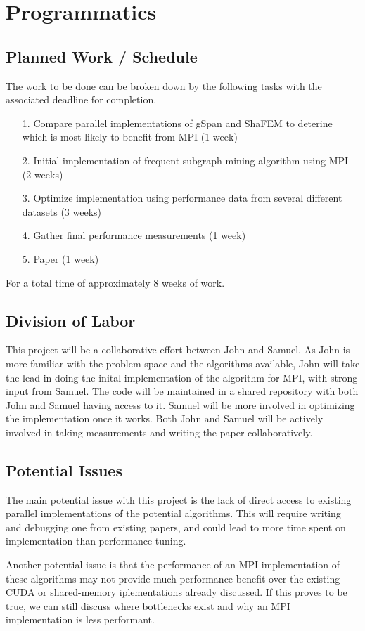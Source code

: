 \section{Programmatics}
\label{sec:programmatics}

\subsection{Planned Work / Schedule}
\label{sec:programmatics:work}

The work to be done can be broken down by the following tasks with the
associated deadline for completion.

\begin{itemize}
	\item[1.]{Compare parallel implementations of gSpan and ShaFEM to
		  deterine which is most likely to benefit from MPI (1 week)}
	\item[2.]{Initial implementation of frequent subgraph mining
		  algorithm using MPI (2 weeks)}
	\item[3.]{Optimize implementation using performance data from several
		  different datasets (3 weeks)}
	\item[4.]{Gather final performance measurements (1 week)}
	\item[5.]{Paper (1 week)}
\end{itemize}

For a total time of approximately 8 weeks of work.

\subsection{Division of Labor}

This project will be a collaborative effort between John and Samuel.
As John is more familiar with the problem space and the algorithms available,
John will take the lead in doing the inital implementation of the algorithm
for MPI, with strong input from Samuel.  The code will be maintained in a 
shared repository with both John and Samuel having access to it. Samuel 
will be more involved in optimizing the implementation once it works.  Both
John and Samuel will be actively involved in taking measurements and writing
the paper collaboratively.

\subsection{Potential Issues}

The main potential issue with this project is the lack of direct access to
existing parallel implementations of the potential algorithms. This will 
require writing and debugging one from existing papers, and could lead to 
more time spent on implementation than performance tuning. 

Another potential issue is that the performance of an MPI implementation 
of these algorithms may not provide much performance benefit over the 
existing CUDA or shared-memory iplementations already discussed.  If this
proves to be true, we can still discuss where bottlenecks exist and why
an MPI implementation is less performant.


